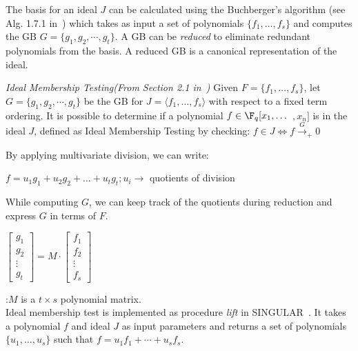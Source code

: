 The \Grobner basis for an ideal $J$ can be calculated using the 
Buchberger's algorithm (see Alg. 1.7.1 
in~\cite{gb_book}) which takes as input a set of polynomials $\{f_1, 
\dots, f_s\}$ and computes the GB $G = \{g_1,g_2,\cdots,g_t\}$.
A GB can be {\it reduced} to eliminate
redundant polynomials from the basis. A reduced GB is a canonical
representation of the ideal. 

\begin{Lemma}
\label{lem:imt}
{\it Ideal Membership Testing(From Section 2.1 in~\cite{gb_book})}
Given $F = \{f_1,\dots,f_s\}$, let $G = \{g_1,g_2,\cdots,g_t\}$ be the GB for
$J = \langle f_1,\dots,f_s\rangle$ with respect to a fixed term ordering.
It is possible to determine if a polynomial $f \in \F_q[x_1,\dots$ $,x_n]$ is
in the ideal $J$, defined as Ideal Membership Testing by checking: 
$f \in J \iff f \xrightarrow{G}_+ 0$

By applying multivariate division, we can write:

$f = u_1g_1 + u_2g_2+ \dots+ u_tg_t;u_i\rightarrow$ quotients of division

While computing $G$, we can keep track of the quotients during reduction and express $G$ in terms of $F$.

\begin{small}
$\begin{bmatrix} g_1 \\ g_2 \\ \vdots \\ g_t \end{bmatrix} = M \cdot
    \begin{bmatrix} f_1 \\ f_2 \\ \vdots \\ f_s \end{bmatrix}$
\end{small} 
:$M$ is a $t\times s$ polynomial matrix.\\
Ideal membership test is implemented as procedure {\it lift} in SINGULAR~\cite{DGPS_410}. 
It takes a polynomial $f$ and ideal $J$ as input parameters and returns a set of polynomials $\{u_1,\dots, u_s\}$ such that $f = u_1f_1 + \cdots + u_sf_s$. 
\end{Lemma}

